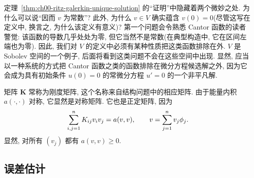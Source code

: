 \setcounter{thmcount}{3}
\begin{Remark}
\label{rem:ch00-hidden-sobolev-points}
定理~\ref{thm:ch00-ritz-galerkin-unique-solution} 的``证明''中隐藏着两个微妙之处. 为什么可以说``因而 $v$ 为常数''? 此外, 为什么 $v\in V$ 确实蕴含 $v(0)=0$(尽管这写在定义中, 换言之, 为什么该定义有意义)? 第一个问题会令熟悉 Cantor 函数的读者警觉: 该函数的导数几乎处处为零, 但它当然不是常数(在典型构造中, 它在区间左端也为零). 因此, 我们对 $V$ 的定义中必须有某种性质把这类函数排除在外. $V$ 是 Sobolev 空间的一个例子, 后面将看到这类问题不会在这些空间中出现. 显然, 应当以一种系统的方式把 Cantor 函数之类的函数排除在微分方程候选解之外, 因为它会成为具有初始条件 $u(0)=0$ 的常微分方程 $u'=0$ 的一个非平凡解.
\end{Remark}

\setcounter{thmcount}{4}
\begin{Remark}
\label{rem:ch00-stiffness-matrix}
矩阵 $\mathbf K$ 常称为刚度矩阵, 这个名称来自结构问题中的相应矩阵. 由于能量内积 $a(\cdot,\cdot)$ 对称, 它显然是对称矩阵. 它也是正定矩阵, 因为
\[
\MathBookFormulaID{formula-ch00-stiffness-positive-definite}
\sum_{i,j=1}^nK_{ij}v_iv_j=a(v,v),
\qquad v=\sum_{j=1}^nv_j\phi_j.
\]
显然, 对所有 $(v_j)$ 都有 $a(v,v)\geq0$. 
\end{Remark}

\subsection{误差估计}
\label{sec:ch00-error-estimates}

